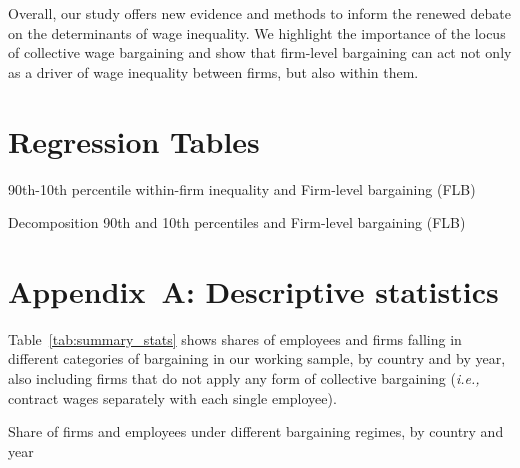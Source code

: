 \documentclass[12pt]{article}
\begin{document}
Overall, our study offers new evidence and methods to inform the renewed debate on the determinants of wage inequality. We highlight the importance of the locus of collective wage bargaining and show that firm-level bargaining can act not only as a driver of wage inequality between firms, but also within them.


\clearpage

\clearpage
\singlespacing


\clearpage

\section*{Regression Tables}
\label{sec:tables}


\begin{table}[hbt]
\caption{90th-10th percentile within-firm inequality and Firm-level bargaining (FLB)}
\label{tab:disp_90_10}

\end{table}

\clearpage


\begin{landscape}
\centering
\begin{table}[htb]
\caption{Decomposition 90th and 10th percentiles and Firm-level bargaining (FLB)}
\label{tab:disp_avg_90_10}
\centering

\end{table}
\end{landscape}

\appendix


\section*{Appendix~A: Descriptive statistics}
\label{sec:appendix_desc}
\setcounter{table}{0}
\renewcommand{\thetable}{A\arabic{table}}

Table~\ref{tab:summary_stats} shows shares of employees and firms falling in different categories of bargaining in our working sample, by country and by year, also including firms that do not apply any form of collective bargaining (\emph{i.e.,} contract wages separately with each single employee).

\begin{table}[hbp]
\centering
\caption{Share of firms and employees under different bargaining regimes, by country and year}
\label{tab:summary_stats}

\end{table}
\end{document}
